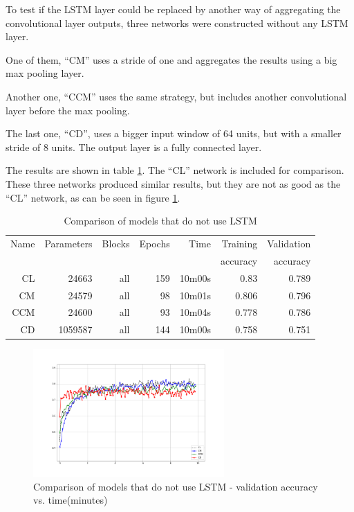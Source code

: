 To test if 
the LSTM layer could be replaced by 
another way of aggregating the convolutional layer outputs, three networks were constructed without any LSTM layer.

One of them, ``CM'' uses a stride of one and aggregates the results using a big max pooling layer.

Another one, ``CCM'' uses the same strategy, but includes another convolutional layer before the max pooling.

The last one, ``CD'', uses a bigger input window of 64 units, but with a smaller stride of 8 units. The output layer is a fully connected layer.

The results are shown in table \ref{tab:carvingnolstm}. The ``CL'' network is included for comparison.
These three networks produced similar results, but they are not as good as the ``CL'' network, as can be seen in figure
\ref{fig:nolstm}.


\begin{table}[!ht]
    \centering
    \caption[No LSTM]{Comparison of models that do not use LSTM}
    \label{tab:carvingnolstm}
\begin{tabular}{r|r|r|r|r|r|r}
\hline
Name & Parameters & Blocks & Epochs & Time & Training          & Validation          \\       
     &            &        &        &         &          accuracy &            accuracy \\ \hline\hline

CL      & 24663     & all   & 159   & 10m00s    & 0.83  & 0.789 \\\hline
CM      & 24579     & all   & 98    & 10m01s    & 0.806 & 0.796 \\\hline
CCM     & 24600     & all   & 93    & 10m04s    & 0.778 & 0.786 \\\hline
CD      & 1059587   & all   & 144   & 10m00s    & 0.758 & 0.751 \\\hline
\end{tabular}
\end{table}

\begin{figure}[htb!]
\centering\includegraphics[width=0.65\textwidth]{content/CL-CM-CCM-CD.png}
\caption[No LSTM]{\label{fig:nolstm}Comparison of models that do not use LSTM - validation accuracy vs. time(minutes)}%
\end{figure}

